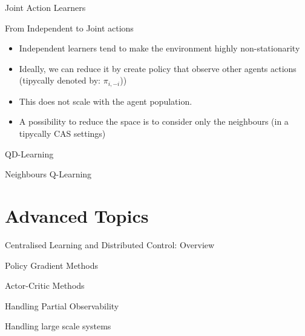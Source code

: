 \documentclass[presentation]{beamer}\mode<presentation>{\usetheme{AMSBolognaFC}}
\begin{document}
\begin{frame}{Joint Action Learners}
	\begin{alertblock}{From Independent to Joint actions}	
		\begin{itemize}
			\item Independent learners tend to make the environment highly non-stationarity
			\item Ideally, we can reduce it by create policy that observe other agents actions (tipycally denoted by: $\pi_{i,-i}$))
			\item This does not scale with the agent population.
			\item A possibility to reduce the space is to consider only the neighbours (in a tipycally CAS settings)
		\end{itemize}
	\end{alertblock}
\end{frame}
\begin{frame}{QD-Learning}

\end{frame}

\begin{frame}{Neighbours Q-Learning}

\end{frame}


\section{Advanced Topics}
\begin{frame}{Centralised Learning and Distributed Control: Overview}

\end{frame}

\begin{frame}{Policy Gradient Methods}

\end{frame}

\begin{frame}{Actor-Critic Methods}

\end{frame}
\begin{frame}{Handling Partial Observability}

\end{frame}

\begin{frame}{Handling large scale systems}

\end{frame}
\end{document}
